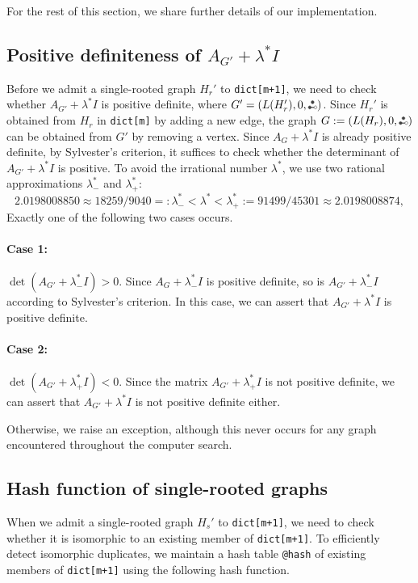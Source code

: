 \documentclass[11pt]{article}
\theoremstyle{definition}
\theoremstyle{remark}
\newcommand{\las}{\lambda^*}
\newcommand{\etwo}{\tikz[baseline=-0.2ex, scale=0.9]{\draw[darkgray, thick] (0,0)--(0.2,0); \draw[darkgray, fill=darkgray] (0,0) circle (0.05); \draw[darkgray, fill=darkgray] (0.1,0.17320508075) circle (0.05); \draw[darkgray, fill=white] (0.2,0) circle (0.05);}}
\newcommand{\ape}[1]{(#1,\etwo)}
\begin{document}
For the rest of this section, we share further details of our implementation.

\subsection{Positive definiteness of \texorpdfstring{$A_{G'} + \las I$}{A\_G + λ*I}} \label{subsec:1}

Before we admit a single-rooted graph $H_r'$ to \texttt{dict[m+1]}, we need to check whether $A_{G'} + \las I$ is positive definite, where $G' = \ape{L(H_r'), 0}$. Since $H_r'$ is obtained from $H_r$ in \texttt{dict[m]} by adding a new edge, the graph $G := \ape{L(H_r), 0}$ can be obtained from $G'$ by removing a vertex. Since $A_G + \las I$ is already positive definite, by Sylvester's criterion, it suffices to check whether the determinant of $A_{G'} + \las I$ is positive. To avoid the irrational number $\las$, we use two rational approximations $\las_-$ and $\las_+$:
\[
    2.0198008850 \approx 18259/9040 =: \las_- < \las < \las_+ := 91499/45301 \approx 2.0198008874,
\]
Exactly one of the following two cases occurs.

\paragraph{Case 1:} $\det(A_{G'} + \las_- I) > 0$. Since $A_G + \las_- I$ is positive definite, so is $A_{G'} + \las_- I$ according to Sylvester's criterion. In this case, we can assert that $A_{G'} + \las I$ is positive definite.

\paragraph{Case 2:} $\det(A_{G'} + \las_+ I) < 0$. Since the matrix $A_{G'} + \las_+ I$ is not positive definite, we can assert that $A_{G'} + \las I$ is not positive definite either.

\bigskip

Otherwise, we raise an exception, although this never occurs for any graph encountered throughout the computer search.

\subsection{Hash function of single-rooted graphs} \label{subsec:3}

When we admit a single-rooted graph $H_s'$ to \texttt{dict[m+1]}, we need to check whether it is isomorphic to an existing member of \texttt{dict[m+1]}. To efficiently detect isomorphic duplicates, we maintain a hash table \texttt{@hash} of existing members of \texttt{dict[m+1]} using the following hash function.
\end{document}
